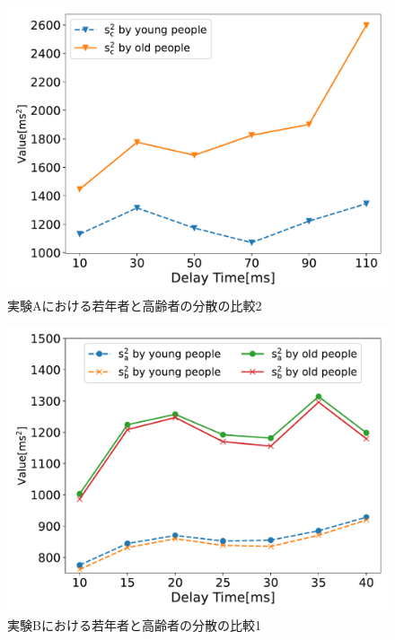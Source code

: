 \begin{figure}[tbp]
  \centering
  \includegraphics[scale=0.5]{figures/Honbann/Comparison_young_old/110_var_Sc.pdf}
  \caption{実験Aにおける若年者と高齢者の分散の比較2}
  \label{fig:Var_110ms_Sc}
\end{figure}

\begin{figure}[tbp]
  \centering
  \includegraphics[scale=0.5]{figures/Honbann/Comparison_young_old/40_var_SaSb.pdf}
  \caption{実験Bにおける若年者と高齢者の分散の比較1}
  \label{fig:Var_40ms_Sa_Sb}
\end{figure}

